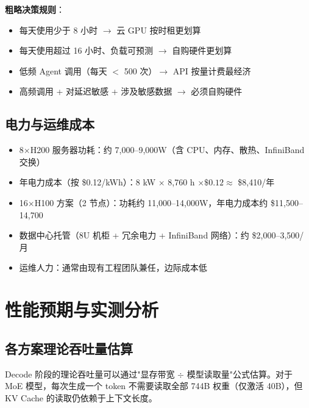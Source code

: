 \documentclass[UTF8,a4paper,10pt,oneside]{ctexart}
\begin{document}
\textbf{粗略决策规则}：
\begin{itemize}
    \item 每天使用少于 8 小时 $\rightarrow$ 云 GPU 按时租更划算
    \item 每天使用超过 16 小时、负载可预测 $\rightarrow$ 自购硬件更划算
    \item 低频 Agent 调用（每天 $<$ 500 次）$\rightarrow$ API 按量计费最经济
    \item 高频调用 + 对延迟敏感 + 涉及敏感数据 $\rightarrow$ 必须自购硬件
\end{itemize}

\subsection{电力与运维成本}

\begin{itemize}
    \item 8$\times$H200 服务器功耗：约 7,000--9,000W（含 CPU、内存、散热、InfiniBand 交换）
    \item 年电力成本（按 \$0.12/kWh）：8 kW $\times$ 8,760 h $\times\$0.12 \approx$ \$8,410/年
    \item 16$\times$H100 方案（2 节点）：功耗约 11,000--14,000W，年电力成本约 \$11,500--14,700
    \item 数据中心托管（8U 机柜 + 冗余电力 + InfiniBand 网络）：约 \$2,000--3,500/月
    \item 运维人力：通常由现有工程团队兼任，边际成本低
\end{itemize}


\section{性能预期与实测分析}

\subsection{各方案理论吞吐量估算}

Decode 阶段的理论吞吐量可以通过"显存带宽 $\div$ 模型读取量"公式估算。对于 MoE 模型，每次生成一个 token 不需要读取全部 744B 权重（仅激活 40B），但 KV Cache 的读取仍依赖于上下文长度。
\end{document}
